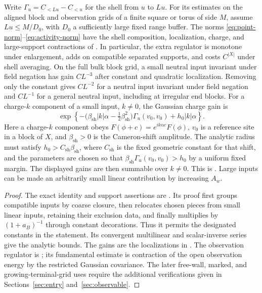 \begin{proposition}
Write \(\Gamma_u=C_{<Lu}-C_{<u}\) for the shell from \(u\) to \(Lu\).
For its estimates on the aligned block and observation grids of a
finite square or torus of side \(M\), assume \(Lu\le M/D_0\), with
\(D_0\) a sufficiently large fixed range buffer.
The norms \eqref{eq:point-norm}--\eqref{eq:activity-norm} have the
shell composition, localization, charge, and large-support
contractions of \cite[Sections~4 and~8, Lemma~9.2]{B}.
In particular, the extra regulator is monotone under enlargement,
adds on compatible separated supports, and costs \(C^{|X|}\) under
shell averaging.  On the full bulk block grid, a small neutral input
invariant under field negation has gain \(CL^{-3}\) after constant and
quadratic localization.  Removing only the constant gives \(CL^{-2}\)
for a neutral input invariant under field negation and \(CL^{-1}\) for a general neutral
input, including at irregular end blocks.  For a charge-\(k\) component
of a small input, \(k\ne0\), the Gaussian charge gain is
\[
 \exp\left\{
 -\bigl(\beta_{\mathrm{sh}}|k|\alpha-\tfrac12\beta_{\mathrm{sh}}^2\bigr)
       \Gamma_u(v_0,v_0)+h_0|k|\alpha\right\}.
\]
Here a charge-\(k\) component obeys
\(F(\phi+c)=e^{ik\alpha c}F(\phi)\), \(v_0\) is a reference site
in a block of \(X\),
and \(\beta_{\mathrm{sh}}>0\) is the Cameron-shift amplitude.
The analytic radius must satisfy
\(h_0>C_{\mathrm{sh}}\beta_{\mathrm{sh}}\), where \(C_{\mathrm{sh}}\)
is the fixed geometric constant for that shift, and the parameters
are chosen so that
\(\beta_{\mathrm{sh}}\Gamma_u(v_0,v_0)>h_0\) by a uniform fixed
margin.  The displayed gains are then summable over \(k\ne0\).
This is \cite[Equation~(4.26)]{B}.  Large inputs can be made an
arbitrarily small linear contribution by increasing \(A_w\).
\end{proposition}

\begin{proof}
The exact identity and support assertions are
\cite[Proposition~4.8]{B}.  Its proof first groups compatible inputs
by coarse closure, then relocates chosen pieces from small linear
inputs, retaining their exclusion data, and finally multiplies by
\((1+a_B)^{-1}\) through constant decorations.  Thus it permits the
designated constants in the statement.  Its convergent multilinear
and scalar-inverse series give the analytic bounds.  The gains are
the localizations in \cite[Section~4]{B}.  The observation regulator
is \cite[Lemma~9.2]{B}; its fundamental estimate is contraction of
the open observation energy by the restricted Gaussian covariance.
The later free-wall, marked, and growing-terminal-grid uses require
the additional verifications given in
Sections~\ref{sec:entry} and~\ref{sec:observable}.
\end{proof}

